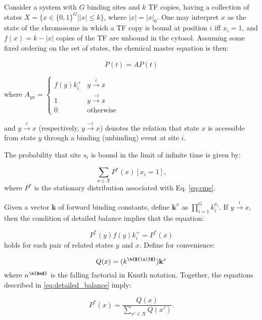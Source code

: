 \documentclass{article}
\begin{document}
Consider a system with $G$ binding sites and $k$ TF copies, having a
collection of states $X = \{x \in \{0,1\}^G | |x| \leq k\}$, where
$|x| = |x|_0$.  One may interpret $x$ as the state of the chromosome
in which a TF copy is bound at position $i$ iff $x_i = 1$, and $f(x) =
k - |x|$ copies of the TF are unbound in the cytosol.  Assuming some
fixed ordering on the set of states, the chemical master equation is
then:

\begin{equation}
  \label{eq:cme}
  \dot P(t) = A P(t)
\end{equation}

where $A_{yx} =
\begin{cases}
  f(y) k_i^+ & y \overset{i}{\rightarrow} x\\
  1 & y \overset{-i}{\rightarrow} x \\
  0 & \textrm{otherwise}
\end{cases}
$

and $y \overset{i}{\rightarrow} x$ (respectively, $y
\overset{-i}{\rightarrow} x$) denotes the relation that state $x$
is accessible from state $y$ through a binding (unbinding) event at
site $i$.  

The probability that site $s_i$ is bound in the limit
of infinite time is given by:

\begin{equation}
\label{eq:marginal}
 \sum_{x\in X}P^*(x)[x_i = 1],
\end{equation}
where $P^*$ is the stationary distribution associated with Eq. \ref{eq:cme}.  

Given a vector $\mathbf{k}$ of forward binding constants, define
$\mathbf{k}^x$ as $\prod_{i=1}^Gk_i^{x_i}$.  If
$y\overset{i}\rightarrow x$, then the condition of detailed balance
implies that the equation:

\begin{equation}
\label{eq:detailed_balance}
P^*(y) f(y)k^+_i = P^*(x)
\end{equation}
holds for each pair of related states $y$ and $x$.  Define for convenience:

\begin{equation}
  \label{eq:q}
  Q(x) = (k^{\b{${|x|}$}})\mathbf{k}^x
\end{equation}
where $n^{\b{$m$}}$ is the falling factorial in Knuth notation.
Together, the equations described in \ref{eq:detailed_balance} imply:

\begin{equation}
  \label{eq:stationary_probability}
  P^*(x)=\frac{Q(x)}{\sum_{x'\in X}Q(x')}.
\end{equation}
\end{document}
